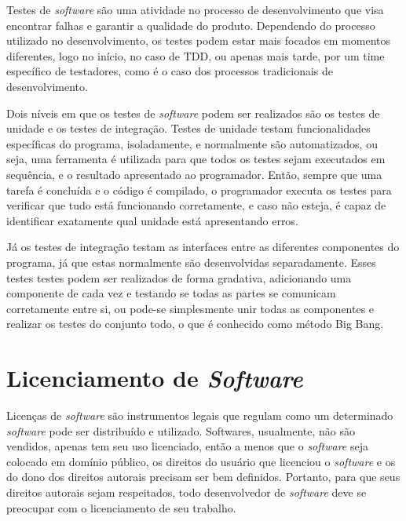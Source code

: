 Testes de \emph{software} são uma atividade no processo de desenvolvimento que visa encontrar falhas e garantir a qualidade do produto. Dependendo do processo utilizado no desenvolvimento, os testes podem estar mais focados em momentos diferentes, logo no início, no caso de TDD, ou apenas mais tarde, por um time específico de testadores, como é o caso dos processos tradicionais de desenvolvimento.

Dois níveis em que os testes de \emph{software} podem ser realizados são os testes de unidade e os testes de integração. Testes de unidade testam funcionalidades específicas do programa, isoladamente, e normalmente são automatizados, ou seja, uma ferramenta é utilizada para que todos os testes sejam executados em sequência, e o resultado apresentado ao programador. Então, sempre que uma tarefa é concluída e o código é compilado, o programador executa os testes para verificar que tudo está funcionando corretamente, e caso não esteja, é capaz de identificar exatamente qual unidade está apresentando erros.

Já os testes de integração testam as interfaces entre as diferentes componentes do programa, já que estas normalmente são desenvolvidas separadamente. Esses testes testes podem ser realizados de forma gradativa, adicionando uma componente de cada vez e testando se todas as partes se comunicam corretamente entre si, ou pode-se simplesmente unir todas as componentes e realizar os testes do conjunto todo, o que é conhecido como método Big Bang.


\section{Licenciamento de \emph{Software}}

Licenças de \emph{software} são instrumentos legais que regulam como um determinado \emph{software} pode ser distribuído e utilizado.
Softwares, usualmente, não são vendidos, apenas tem seu uso licenciado, então a menos que o \emph{software} seja colocado em domínio público, os direitos do usuário que licenciou o \emph{software} e os do dono dos direitos autorais precisam ser bem definidos. Portanto, para que seus direitos autorais sejam respeitados, todo desenvolvedor de \emph{software} deve se preocupar com o licenciamento de seu trabalho.

